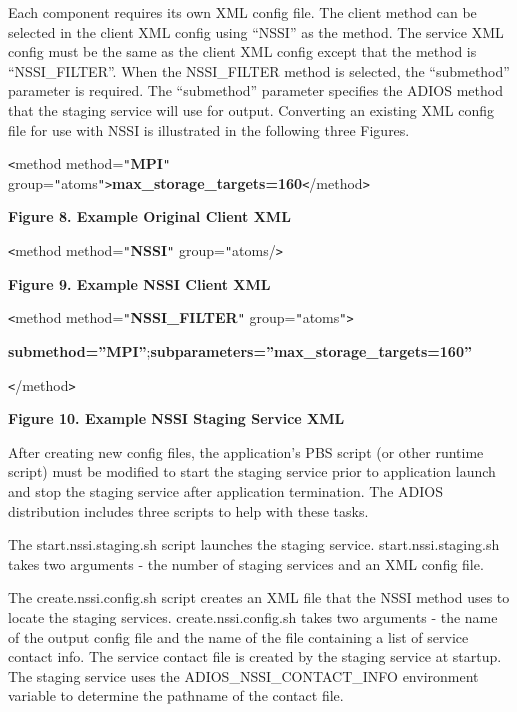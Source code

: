 Each component requires its own XML config file.  The client method can be selected 
in the client XML config using ``NSSI'' as the method.  The service XML config 
must be the same as the client XML config except that the method is ``NSSI\_FILTER''. 
 When the NSSI\_FILTER method is selected, the ``submethod'' parameter is required. 
 The ``submethod'' parameter specifies the ADIOS method that the staging service 
will use for output.  Converting an existing XML config file for use with NSSI 
is illustrated in the following three Figures.


\texttt{<}method method=\texttt{"}\textbf{MPI}\texttt{"} group=\texttt{"}atoms\texttt{"}\texttt{>}\textbf{max\_storage\_targets=160}\texttt{<}/method\texttt{>}

\label{HToc144350167}

\leftskip=18pt
{\color{color20} \textbf{Figure 8. Example Original Client XML}}



\texttt{<}method method=\texttt{"}\textbf{NSSI}\texttt{"} group=\texttt{"}atoms/\texttt{>}

\label{HToc144350168}

{\color{color20} \textbf{Figure 9. Example NSSI Client XML}}



\texttt{<}method method=\texttt{"}\textbf{NSSI\_FILTER}\texttt{"} group=\texttt{"}atoms\texttt{"}\texttt{>}

\textbf{submethod=''MPI''};\textbf{subparameters=''max\_storage\_targets=160''}

\texttt{<}/method\texttt{>}

\label{HToc144350169}

{\color{color20} \textbf{Figure 10. Example NSSI Staging Service XML}}

\leftskip=0pt
After creating new config files, the application's PBS script (or other runtime 
script) must be modified to start the staging service prior to application launch 
and stop the staging service after application termination. The ADIOS distribution 
includes three scripts to help with these tasks.

The start.nssi.staging.sh script launches the staging service.  start.nssi.staging.sh 
takes two arguments - the number of staging services and an XML config file.

The create.nssi.config.sh script creates an XML file that the NSSI method uses 
to locate the staging services.  create.nssi.config.sh takes two arguments - the 
name of the output config file and the name of the file containing a list of service 
contact info.  The service contact file is created by the staging service at startup. 
 The staging service uses the ADIOS\_NSSI\_CONTACT\_INFO environment variable to 
determine the pathname of the contact file.

